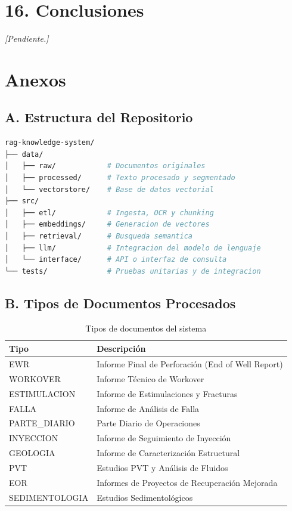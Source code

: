 \documentclass[12pt, a4paper]{report}
\begin{document}
\chapter*{16. Conclusiones}

\textit{[Pendiente.]}

\chapter*{Anexos}

\section*{A. Estructura del Repositorio}

\begin{lstlisting}[language=bash, caption={Estructura del proyecto}]
rag-knowledge-system/
├── data/
│   ├── raw/            # Documentos originales
│   ├── processed/      # Texto procesado y segmentado
│   └── vectorstore/    # Base de datos vectorial
├── src/
│   ├── etl/            # Ingesta, OCR y chunking
│   ├── embeddings/     # Generacion de vectores
│   ├── retrieval/      # Busqueda semantica
│   ├── llm/            # Integracion del modelo de lenguaje
│   └── interface/      # API o interfaz de consulta
└── tests/              # Pruebas unitarias y de integracion
\end{lstlisting}

\section*{B. Tipos de Documentos Procesados}

\begin{table}[H]
  \centering
  \begin{tabular}{ll}
    \toprule
    \textbf{Tipo} & \textbf{Descripción} \\
    \midrule
    EWR           & Informe Final de Perforación (End of Well Report) \\
    WORKOVER      & Informe Técnico de Workover \\
    ESTIMULACION  & Informe de Estimulaciones y Fracturas \\
    FALLA         & Informe de Análisis de Falla \\
    PARTE\_DIARIO  & Parte Diario de Operaciones \\
    INYECCION     & Informe de Seguimiento de Inyección \\
    GEOLOGIA      & Informe de Caracterización Estructural \\
    PVT           & Estudios PVT y Análisis de Fluidos \\
    EOR           & Informes de Proyectos de Recuperación Mejorada \\
    SEDIMENTOLOGIA& Estudios Sedimentológicos \\
    \bottomrule
  \end{tabular}
  \caption{Tipos de documentos del sistema}
\end{table}
\end{document}
